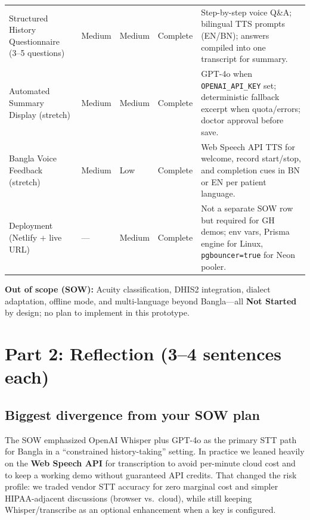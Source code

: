 \documentclass[11pt]{article}
\begin{document}
\begin{longtable}{@{}>{\raggedright\arraybackslash}p{3.4cm}>{\centering\arraybackslash}p{1.9cm}>{\centering\arraybackslash}p{2.0cm}>{\centering\arraybackslash}p{2.0cm}>{\raggedright\arraybackslash}p{4.7cm}@{}}
Structured History Questionnaire (3--5 questions)
  & Medium & Medium & Complete
  & Step-by-step voice Q\&A; bilingual TTS prompts (EN/BN); answers compiled into one transcript for summary. \\

Automated Summary Display (stretch)
  & Medium & Medium & Complete
  & GPT-4o when \texttt{OPENAI\_API\_KEY} set; deterministic fallback excerpt when quota/errors; doctor approval before save. \\

Bangla Voice Feedback (stretch)
  & Medium & Low & Complete
  & Web Speech API TTS for welcome, record start/stop, and completion cues in BN or EN per patient language. \\

Deployment (Netlify + live URL)
  & --- & Medium & Complete
  & Not a separate SOW row but required for GH demos; env vars, Prisma engine for Linux, \texttt{pgbouncer=true} for Neon pooler. \\

\end{longtable}

\noindent\textbf{Out of scope (SOW):} Acuity classification, DHIS2 integration, dialect adaptation, offline mode, and multi-language beyond Bangla---all \textbf{Not Started} by design; no plan to implement in this prototype.

\vspace{1em}

\section*{Part 2: Reflection (3--4 sentences each)}

\subsection*{Biggest divergence from your SOW plan}

The SOW emphasized OpenAI Whisper plus GPT-4o as the primary STT path for Bangla in a ``constrained history-taking'' setting. In practice we leaned heavily on the \textbf{Web Speech API} for transcription to avoid per-minute cloud cost and to keep a working demo without guaranteed API credits. That changed the risk profile: we traded vendor STT accuracy for zero marginal cost and simpler HIPAA-adjacent discussions (browser vs.\ cloud), while still keeping Whisper/transcribe as an optional enhancement when a key is configured.
\end{document}
